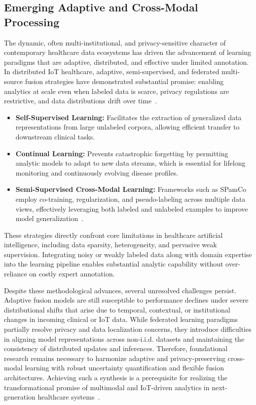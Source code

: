 \documentclass[sigconf]{acmart}
\begin{document}
\subsection{Emerging Adaptive and Cross-Modal Processing}

The dynamic, often multi-institutional, and privacy-sensitive character of contemporary healthcare data ecosystems has driven the advancement of learning paradigms that are adaptive, distributed, and effective under limited annotation. In distributed IoT healthcare, adaptive, semi-supervised, and federated multi-source fusion strategies have demonstrated substantial promise: enabling analytics at scale even when labeled data is scarce, privacy regulations are restrictive, and data distributions drift over time~\cite{ref105,ref106,ref107}. 

\begin{itemize}
    \item \textbf{Self-Supervised Learning:} Facilitates the extraction of generalized data representations from large unlabeled corpora, allowing efficient transfer to downstream clinical tasks.
    \item \textbf{Continual Learning:} Prevents catastrophic forgetting by permitting analytic models to adapt to new data streams, which is essential for lifelong monitoring and continuously evolving disease profiles.
    \item \textbf{Semi-Supervised Cross-Modal Learning:} Frameworks such as SPamCo employ co-training, regularization, and pseudo-labeling across multiple data views, effectively leveraging both labeled and unlabeled examples to improve model generalization~\cite{ref104,ref105}.
\end{itemize}

These strategies directly confront core limitations in healthcare artificial intelligence, including data sparsity, heterogeneity, and pervasive weak supervision. Integrating noisy or weakly labeled data along with domain expertise into the learning pipeline enables substantial analytic capability without over-reliance on costly expert annotation.

Despite these methodological advances, several unresolved challenges persist. Adaptive fusion models are still susceptible to performance declines under severe distributional shifts that arise due to temporal, contextual, or institutional changes in incoming clinical or IoT data. While federated learning paradigms partially resolve privacy and data localization concerns, they introduce difficulties in aligning model representations across non-i.i.d. datasets and maintaining the consistency of distributed updates and inferences. Therefore, foundational research remains necessary to harmonize adaptive and privacy-preserving cross-modal learning with robust uncertainty quantification and flexible fusion architectures. Achieving such a synthesis is a prerequisite for realizing the transformational promise of multimodal and IoT-driven analytics in next-generation healthcare systems~\cite{ref104,ref105,ref106,ref107}.
\end{document}
